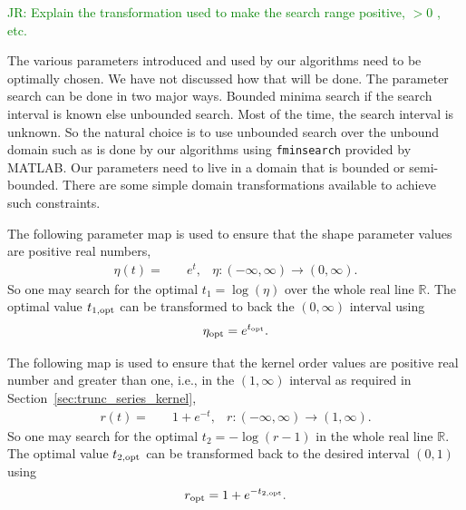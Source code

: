 \documentclass{iitthesis}          %
\newcommand{\reals}{\mathbb{R}}
\newcommand{\code}[1]{\texttt{#1}}
\newcommand\secref{Section~\ref}
\newcommand{\JRNote}[1]{{\textcolor{green}{JR: #1}}}
\begin{document}
\label{sec:kernel_param_search}

\JRNote{Explain the transformation used to make the search range positive, $> 0$ , etc.}

The various parameters introduced and used by our algorithms need to be optimally chosen. We have not discussed how that will be done. 
The parameter search can be done in two major ways. 
Bounded minima search if the search interval is known else unbounded search.  Most of the time, the search interval is unknown. So the natural choice is to use unbounded search over the unbound domain such as is done by our algorithms using \code{fminsearch} provided by MATLAB.
Our parameters need to live in a domain that is bounded or semi-bounded. 
There are some simple domain transformations available to achieve such constraints.

The following parameter map is used to ensure that the shape parameter values are positive real numbers,
\begin{align*}
\eta{(t)} = & \quad e^{t}, & \eta : (-\infty, \infty) \to (0, \infty).
\end{align*}
So one may search for the optimal $t_1 = \log(\eta)$ over the whole real line $\reals$. 
The optimal value $t_{1, \textup{opt}}$ can be transformed to back the $(0, \infty)$ interval using 
\begin{align*}
\eta_{\textup{opt}} = e^{t_{\textup{opt}}}.
\end{align*}



The following map is used to ensure that the kernel order values are positive real number and greater than one, i.e., in the $(1, \infty)$ interval as required in \secref{sec:trunc_series_kernel},
\begin{align*}
r(t) = & \quad {1 + e^{-t}}, & r:  (-\infty, \infty) \to (1,\infty).
\end{align*}
So one may search for the optimal $t_2 = -\log(r-1)$ in the whole real line $\reals$.
The optimal value $t_{2, \textup{opt}}$ can be transformed back to the desired interval $(0,1)$ using 
\begin{align*}
r_{\textup{opt}} = 1+ e^{-t_{2, \textup{opt}}}.
\end{align*}
\end{document}
